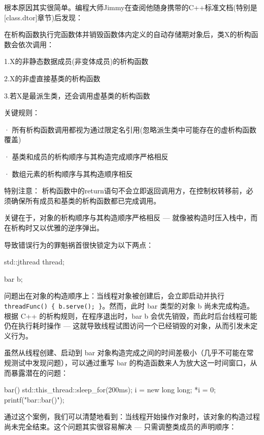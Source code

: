 根本原因其实很简单。编程大师Jimmy在查阅他随身携带的C++标准文档(特别是[class.dtor]章节)后发现：

\begin{shell}
在析构函数执行完函数体并销毁函数体内定义的自动存储期对象后，类X的析构函数会依次调用：

1.X的非静态数据成员(非变体成员)的析构函数

2.X的非虚直接基类的析构函数

3.若X是最派生类，还会调用虚基类的析构函数

关键规则：

· 所有析构函数调用都视为通过限定名引用(忽略派生类中可能存在的虚析构函数覆盖)

· 基类和成员的析构顺序与其构造完成顺序严格相反

· 数组元素的析构顺序与其构造顺序相反

特别注意：
析构函数中的return语句不会立即返回调用方，在控制权转移前，必须确保所有成员和基类的析构函数都已完成调用。
\end{shell}

关键在于，对象的析构顺序与其构造顺序严格相反 --- 就像被构造时压入栈中，而在析构时又以优雅的逆序弹出。

导致错误行为的罪魁祸首很快锁定为以下两点：

\begin{cpp}
std::jthread thread;
\end{cpp}

\begin{cpp}
bar b;
\end{cpp}

问题出在对象的构造顺序上：当线程对象被创建后，会立即启动并执行 \verb|threadFunc() { b.serve(); }|。然而，此时 bar 类型的对象 b 尚未完成构造。根据 C++ 的析构规则，在程序退出时，bar b 会优先销毁，而此时后台线程可能仍在执行耗时操作 --- 这就导致线程试图访问一个已经销毁的对象，从而引发未定义行为。

虽然从线程创建、启动到 bar 对象构造完成之间的时间差极小（几乎不可能在常规测试中发现问题），可以通过重写 bar 的构造函数来人为放大这一时间窗口，从而暴露潜在的问题：

\begin{cpp}
bar() { std::this_thread::sleep_for(200ms);
  i = new long long; *i = 0; printf("bar::bar()\n ");}
\end{cpp}

通过这个案例，我们可以清楚地看到：当线程开始操作对象时，该对象的构造过程尚未完全结束。这个问题其实很容易解决 --- 只需调整类成员的声明顺序：

